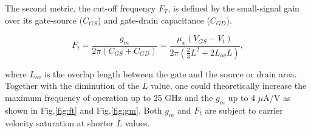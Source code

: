

The second metric, the cut-off frequency $F_T$, is defined by the small-signal gain over its gate-source ($C_{GS}$) and gate-drain capacitance ($C_{GD}$).

\begin{equation}
\label{eq:Ft}
F_t = \frac{g_m}{2\pi(C_{GS}+C_{GD})} = \frac{\mu_x(V_{GS}-V_t)}{2\pi (\frac{2}{3}L^2+2L_{ov}L)},
\end{equation}

where $L_{ov}$ is the overlap length between the gate and the source or drain area.
Together with the diminution of the $L$ value, one could theoretically increase the maximum frequency of operation up to 25 GHz and the $g_m$ up to 4 $\mu$A/V as shown in Fig.\ref{fig:ft} and Fig.\ref{fig:gm}.
Both $g_m$ and $F_t$ are subject to carrier velocity saturation at shorter $L$ values. 

